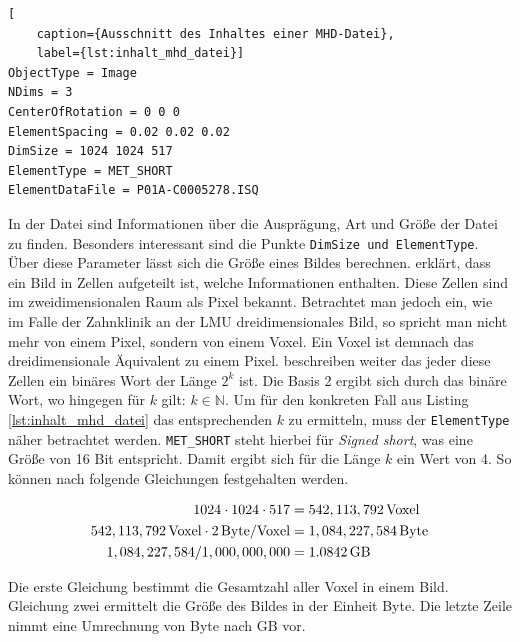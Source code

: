 \begin{lstlisting}[
	caption={Ausschnitt des Inhaltes einer MHD-Datei},
	label={lst:inhalt_mhd_datei}]
ObjectType = Image
NDims = 3
CenterOfRotation = 0 0 0
ElementSpacing = 0.02 0.02 0.02
DimSize = 1024 1024 517
ElementType = MET_SHORT
ElementDataFile = P01A-C0005278.ISQ
\end{lstlisting}

In der Datei sind Informationen über die Ausprägung, Art und Größe der Datei zu finden.
Besonders interessant sind die Punkte \texttt{DimSize und ElementType}. Über
diese Parameter lässt sich die Größe eines Bildes berechnen. \citet[S.~10-11]{burger2009}
erklärt, dass ein Bild in Zellen aufgeteilt ist, welche Informationen enthalten.
Diese Zellen sind im zweidimensionalen Raum als Pixel bekannt. Betrachtet man
jedoch ein, wie im Falle der Zahnklinik an der \ac{LMU} dreidimensionales Bild, so
spricht man nicht mehr von einem Pixel, sondern von einem Voxel. Ein Voxel ist demnach
das dreidimensionale Äquivalent zu einem Pixel. \citet[S.~10-11]{burger2009} beschreiben
weiter das jeder diese Zellen ein binäres Wort der Länge $2^{k}$ ist. Die Basis
2 ergibt sich durch das binäre Wort, wo hingegen für $k$ gilt:
$k \in \mathbb{N}$. Um für den konkreten Fall aus Listing \ref{lst:inhalt_mhd_datei}
das entsprechenden $k$ zu ermitteln, muss der \texttt{ElementType} näher betrachtet
werden. \texttt{MET\_SHORT} steht hierbei für \textit{Signed short}, was eine Größe
von 16 Bit entspricht. Damit ergibt sich für die Länge $k$ ein Wert von 4. So
können nach \citet[S.~10-11]{burger2009} folgende Gleichungen festgehalten werden.

\begin{align}
	\label{equ:größe_bestimmen}1024 \cdot 1024 \cdot 517    & = 542,113,792 \, \text{Voxel}\notag  \\
	542,113,792 \, \text{Voxel}\cdot 2 \, \text{Byte/Voxel} & = 1,084,227,584 \, \text{Byte}\notag \\
	1,084,227,584 / 1,000,000,000                           & = 1.0842 \, \text{GB}
\end{align}

Die erste Gleichung bestimmt die Gesamtzahl aller Voxel in einem Bild. Gleichung
zwei ermittelt die Größe des Bildes in der Einheit Byte. Die letzte Zeile nimmt
eine Umrechnung von Byte nach \ac{GB} vor.

